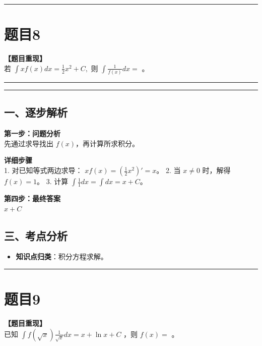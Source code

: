 \documentclass[12pt, a4paper]{ctexart}
\newcommand{\TopSeparator}{
    \par\noindent\rule{\textwidth}{1.5pt}\vspace{0.5em} %
}
\newcommand{\AnalysisSeparator}{
    \par\noindent\rule{\textwidth}{0.5pt}\vspace{0.2em}\hrule\vspace{0.5em} %
}
\newenvironment{RedAnalysis}{
    \par
    \color{red} %
}{
    \par
    \color{black} %
}
\begin{document}
\vspace{2em}

\TopSeparator
\section*{题目8}

\textbf{【题目重现】} \\
若 $ \int xf(x)dx=\frac{1}{2}x^{2}+C, $ 则 $ \int\frac{1}{f(x)}dx= $ \underline{\hspace{2cm}}。

\AnalysisSeparator

\begin{RedAnalysis}

\subsection*{一、逐步解析}

\textbf{第一步：问题分析} \\
先通过求导找出 $f(x)$，再计算所求积分。

\textbf{详细步骤} \\
1. 对已知等式两边求导：
   $x f(x) = (\frac{1}{2}x^2)' = x$。
2. 当 $x \neq 0$ 时，解得 $f(x) = 1$。
3. 计算 $\int \frac{1}{1} dx = \int dx = x + C$。

\textbf{第四步：最终答案} \\
$ x + C $

\subsection*{三、考点分析}
\begin{itemize}
    \item \textbf{知识点归类}：积分方程求解。
\end{itemize}

\end{RedAnalysis}

\vspace{2em}

\TopSeparator
\section*{题目9}

\textbf{【题目重现】} \\
已知 $ \int f(\sqrt{x})\frac{1}{\sqrt{x}}dx = x + \ln x + C $ ，则 $ f(x) = $ \underline{\hspace{2cm}}。
\end{document}
